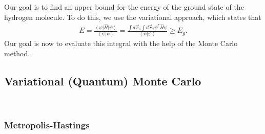 Our goal is to find an upper bound for the energy of the ground state of the hydrogen molecule. To do this, we use the variational approach, which states that 
\begin{align}
E = \frac{{\left\langle \psi  \right|\hat H\left| \psi  \right\rangle }}{{\left\langle \psi  \right|\left. \psi  \right\rangle }} = \frac{{\int {d{{\vec r}_1}\int {d{{\vec r}_2}} {\psi ^ * }\hat H\psi } }}{{\left\langle \psi  \right|\left. \psi  \right\rangle }} \ge {E_g}.
\label{eq:main}
\end{align}
Our goal is now to evaluate this integral with the help of the Monte Carlo method. 
\subsection{Variational (Quantum) Monte Carlo}
\\
\subsubsection{Metropolis-Hastings}

